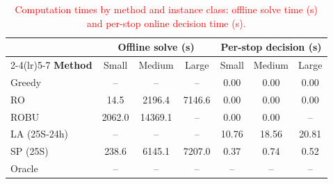 \documentclass[preprint,12pt,3p]{elsarticle}
\newcommand{\red}[1]{\textcolor{red}{#1}}
\newcommand{\blue}[1]{{\color{darkblue}#1}}
\begin{document}
\begin{table}[htbp]
\centering
\caption{\red{Computation times by method and instance class: offline solve time (s) and per-stop online decision time (s).}}
\label{tab:runtime}
\begin{tabular}{lcccccc}
\toprule
& \multicolumn{3}{c}{\textbf{Offline solve (s)}} & \multicolumn{3}{c}{\textbf{Per-stop decision (s)}}\\
\cmidrule(lr){2-4}\cmidrule(lr){5-7}
\textbf{Method} & Small & Medium & Large & Small & Medium & Large\\
\midrule
Greedy & -- & -- & -- & 0.00 & 0.00 & 0.00 \\
RO & \blue{14.5} & \blue{2196.4} & \blue{7146.6} & 0.00 & 0.00 & 0.00 \\
ROBU & 2062.0 & \blue{14369.1} & -- & 0.00 & \blue{0.00} & -- \\
LA (25S-24h) & -- & -- & -- & \blue{10.76} & \blue{18.56} & \blue{20.81} \\
SP (25S) & \blue{238.6} & \blue{6145.1} & \blue{7207.0} & 0.37 & \blue{0.74} & \blue{0.52} \\
Oracle & -- & -- & -- & -- & -- & -- \\
\bottomrule
\end{tabular}
\end{table}
\end{document}
